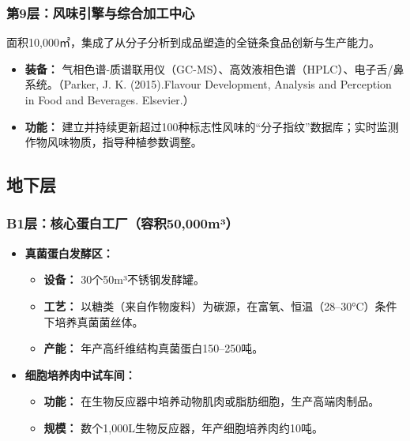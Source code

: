 \subsubsection{第9层：风味引擎与综合加工中心}\label{ux7b2c9ux5c42ux98ceux5473ux5f15ux64ceux4e0eux7efcux5408ux52a0ux5de5ux4e2dux5fc3}

面积10,000㎡，集成了从分子分析到成品塑造的全链条食品创新与生产能力。

\begin{itemize}
\item
  \textbf{装备：} 气相色谱-质谱联用仪（GC-MS）、高效液相色谱（HPLC）、电子舌/鼻系统。（Parker, J. K. (2015).Flavour Development, Analysis and Perception in Food and Beverages. Elsevier.）
\item
  \textbf{功能：} 建立并持续更新超过100种标志性风味的``分子指纹''数据库；实时监测作物风味物质，指导种植参数调整。
\end{itemize}

\subsection{地下层}\label{ux5730ux4e0bux5c42}

\subsubsection{B1层：核心蛋白工厂（容积50,000m³）}\label{b1ux5c42ux6838ux5fc3ux86cbux767dux5de5ux5382ux5bb9ux79ef50000muxb3}

\begin{itemize}
\item
  \textbf{真菌蛋白发酵区：}

  \begin{itemize}
  \item
    \textbf{设备：} 30个50m³不锈钢发酵罐。
  \item
    \textbf{工艺：} 以糖类（来自作物废料）为碳源，在富氧、恒温（28--30°C）条件下培养真菌菌丝体。
  \item
    \textbf{产能：} 年产高纤维结构真菌蛋白150--250吨。
  \end{itemize}
\item
  \textbf{细胞培养肉中试车间：}

  \begin{itemize}
  \item
    \textbf{功能：} 在生物反应器中培养动物肌肉或脂肪细胞，生产高端肉制品。
  \item
    \textbf{规模：} 数个1,000L生物反应器，年产细胞培养肉约10吨。
  \end{itemize}
\end{itemize}

